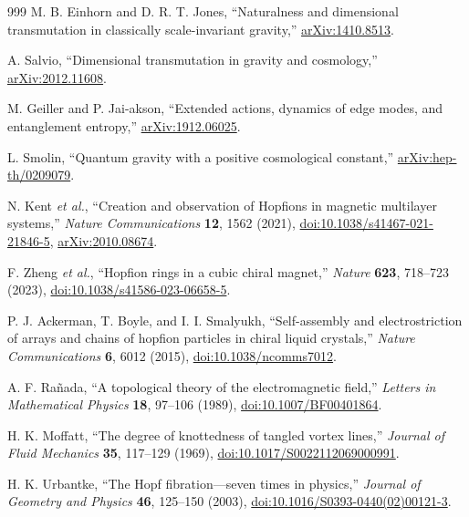 \documentclass[aps,prd,reprint,nofootinbib,superscriptaddress,floatfix]{revtex4-2}
\numberwithin{equation}{section}
\theoremstyle{definition}
\theoremstyle{plain}
\begin{document}
\begin{thebibliography}{999}
M. B. Einhorn and D. R. T. Jones,
``Naturalness and dimensional transmutation in classically scale-invariant gravity,''
\href{https://arxiv.org/abs/1410.8513}{arXiv:1410.8513}.

A. Salvio,
``Dimensional transmutation in gravity and cosmology,''
\href{https://arxiv.org/abs/2012.11608}{arXiv:2012.11608}.

M. Geiller and P. Jai-akson,
``Extended actions, dynamics of edge modes, and entanglement entropy,''
\href{https://arxiv.org/abs/1912.06025}{arXiv:1912.06025}.


L. Smolin,
``Quantum gravity with a positive cosmological constant,''
\href{https://arxiv.org/abs/hep-th/0209079}{arXiv:hep-th/0209079}.



N. Kent \emph{et al.},
``Creation and observation of Hopfions in magnetic multilayer systems,''
\emph{Nature Communications} \textbf{12}, 1562 (2021),
\href{https://doi.org/10.1038/s41467-021-21846-5}{doi:10.1038/s41467-021-21846-5},
\href{https://arxiv.org/abs/2010.08674}{arXiv:2010.08674}.

F. Zheng \emph{et al.},
``Hopfion rings in a cubic chiral magnet,''
\emph{Nature} \textbf{623}, 718--723 (2023),
\href{https://doi.org/10.1038/s41586-023-06658-5}{doi:10.1038/s41586-023-06658-5}.

P. J. Ackerman, T. Boyle, and I. I. Smalyukh,
``Self-assembly and electrostriction of arrays and chains of hopfion particles in chiral liquid crystals,''
\emph{Nature Communications} \textbf{6}, 6012 (2015),
\href{https://doi.org/10.1038/ncomms7012}{doi:10.1038/ncomms7012}.

A. F. Rañada,
``A topological theory of the electromagnetic field,''
\emph{Letters in Mathematical Physics} \textbf{18}, 97--106 (1989),
\href{https://doi.org/10.1007/BF00401864}{doi:10.1007/BF00401864}.

H. K. Moffatt,
``The degree of knottedness of tangled vortex lines,''
\emph{Journal of Fluid Mechanics} \textbf{35}, 117--129 (1969),
\href{https://doi.org/10.1017/S0022112069000991}{doi:10.1017/S0022112069000991}.

H. K. Urbantke,
``The Hopf fibration---seven times in physics,''
\emph{Journal of Geometry and Physics} \textbf{46}, 125--150 (2003),
\href{https://doi.org/10.1016/S0393-0440(02)00121-3}{doi:10.1016/S0393-0440(02)00121-3}.


\end{thebibliography}
\end{document}
